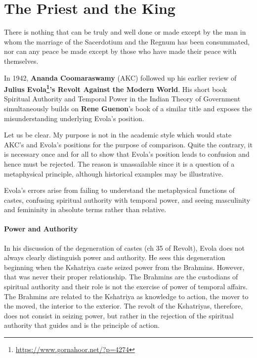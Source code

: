 \section{The Priest and the King}

\begin{quotex}
There is nothing that can be truly and well done or made except by the man in whom the marriage of the Sacerdotium and the Regnum has been consummated, nor can any peace be made except by those who have made their peace with themselves.
\end{quotex}


In 1942, \textbf{Ananda Coomaraswamy} (AKC) followed up his earlier review of \textbf{Julius Evola\footnote{\url{https://www.gornahoor.net/?p=4274}}'s Revolt Against the Modern World}. His short book Spiritual Authority and Temporal Power in the Indian Theory of Government simultaneously builds on \textbf{Rene Guenon}'s book of a similar title and exposes the misunderstanding underlying Evola's position.

Let us be clear. My purpose is not in the academic style which would state AKC's and Evola's positions for the purpose of comparison. Quite the contrary, it is necessary once and for all to show that Evola's position leads to confusion and hence must be rejected. The reason is unassailable since it is a question of a metaphysical principle, although historical examples may be illustrative.

Evola's errors arise from failing to understand the metaphysical functions of castes, confusing spiritual authority with temporal power, and seeing masculinity and femininity in absolute terms rather than relative.

\paragraph{Power and Authority}


In his discussion of the degeneration of castes (ch 35 of Revolt), Evola does not always clearly distinguish power and authority. He sees this degeneration beginning when the Kshatriya caste seized power from the Brahmins. However, that was never their proper relationship. The Brahmins are the custodians of spiritual authority and their role is not the exercise of power of temporal affairs. The Brahmins are related to the Kshatriya as knowledge to action, the mover to the moved, the interior to the exterior. The revolt of the Kshatriyas, therefore, does not consist in seizing power, but rather in the rejection of the spiritual authority that guides and is the principle of action.

